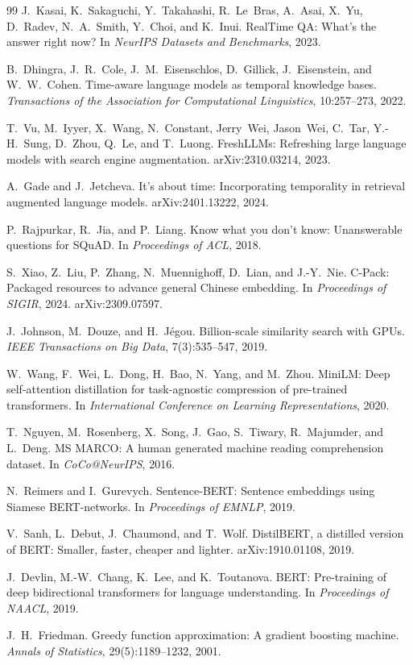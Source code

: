 \documentclass[11pt,letterpaper]{article}
\begin{document}
\begin{thebibliography}{99}
J.~Kasai, K.~Sakaguchi, Y.~Takahashi, R.~Le~Bras, A.~Asai, X.~Yu, D.~Radev, N.~A.~Smith, Y.~Choi, and K.~Inui.
RealTime QA: What's the answer right now?
In \emph{NeurIPS Datasets and Benchmarks}, 2023.

B.~Dhingra, J.~R.~Cole, J.~M.~Eisenschlos, D.~Gillick, J.~Eisenstein, and W.~W.~Cohen.
Time-aware language models as temporal knowledge bases.
\emph{Transactions of the Association for Computational Linguistics}, 10:257--273, 2022.

T.~Vu, M.~Iyyer, X.~Wang, N.~Constant, Jerry~Wei, Jason~Wei, C.~Tar, Y.-H.~Sung, D.~Zhou, Q.~Le, and T.~Luong.
FreshLLMs: Refreshing large language models with search engine augmentation.
arXiv:2310.03214, 2023.

A.~Gade and J.~Jetcheva.
It's about time: Incorporating temporality in retrieval augmented language models.
arXiv:2401.13222, 2024.

P.~Rajpurkar, R.~Jia, and P.~Liang.
Know what you don't know: Unanswerable questions for SQuAD.
In \emph{Proceedings of ACL}, 2018.

S.~Xiao, Z.~Liu, P.~Zhang, N.~Muennighoff, D.~Lian, and J.-Y.~Nie.
C-Pack: Packaged resources to advance general Chinese embedding.
In \emph{Proceedings of SIGIR}, 2024.
arXiv:2309.07597.

J.~Johnson, M.~Douze, and H.~J\'egou.
Billion-scale similarity search with GPUs.
\emph{IEEE Transactions on Big Data}, 7(3):535--547, 2019.

W.~Wang, F.~Wei, L.~Dong, H.~Bao, N.~Yang, and M.~Zhou.
MiniLM: Deep self-attention distillation for task-agnostic compression of pre-trained transformers.
In \emph{International Conference on Learning Representations}, 2020.

T.~Nguyen, M.~Rosenberg, X.~Song, J.~Gao, S.~Tiwary, R.~Majumder, and L.~Deng.
MS MARCO: A human generated machine reading comprehension dataset.
In \emph{CoCo@NeurIPS}, 2016.

N.~Reimers and I.~Gurevych.
Sentence-BERT: Sentence embeddings using Siamese BERT-networks.
In \emph{Proceedings of EMNLP}, 2019.

V.~Sanh, L.~Debut, J.~Chaumond, and T.~Wolf.
DistilBERT, a distilled version of BERT: Smaller, faster, cheaper and lighter.
arXiv:1910.01108, 2019.

J.~Devlin, M.-W.~Chang, K.~Lee, and K.~Toutanova.
BERT: Pre-training of deep bidirectional transformers for language understanding.
In \emph{Proceedings of NAACL}, 2019.

J.~H.~Friedman.
Greedy function approximation: A gradient boosting machine.
\emph{Annals of Statistics}, 29(5):1189--1232, 2001.

\end{thebibliography}
\end{document}
